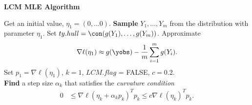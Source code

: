 {\small
\noindent \textbf{LCM MLE Algorithm}

\noindent \begin{algorithmic}[1]
\State Get an initial value, $\eta_1 = (0, \ldots 0)$.
\State \textbf{Sample} $Y_1, \ldots, Y_m$ from the distribution with parameter $\eta_{1}$.  
\State Set $ty.hull = \con(g(Y_1), \ldots, g(Y_m) )$.
\State Approximate 
\begin{align} \label{E:nabla ell approx}
\nabla \ell( \eta_1) \approx g(\yobs) - \frac{1}{m}\sum_{i=1}^m g(Y_i).
\end{align}
\State Set $p_1 = \nabla \ell( \eta_1)$, $k=1$, $LCM.flag$ = FALSE, $c=0.2$.\\

\State \textbf{Find} a step size $\alpha_k$ that satisfies the \textit{curvature condition}
\begin{align}\label{E:curvature}
	 0 & \leq \nabla \ell( \eta_k + \alpha_k p_k)^T p_k \leq c \nabla \ell(\eta_k)^T p_k.
\end{align}


\end{algorithmic}}
